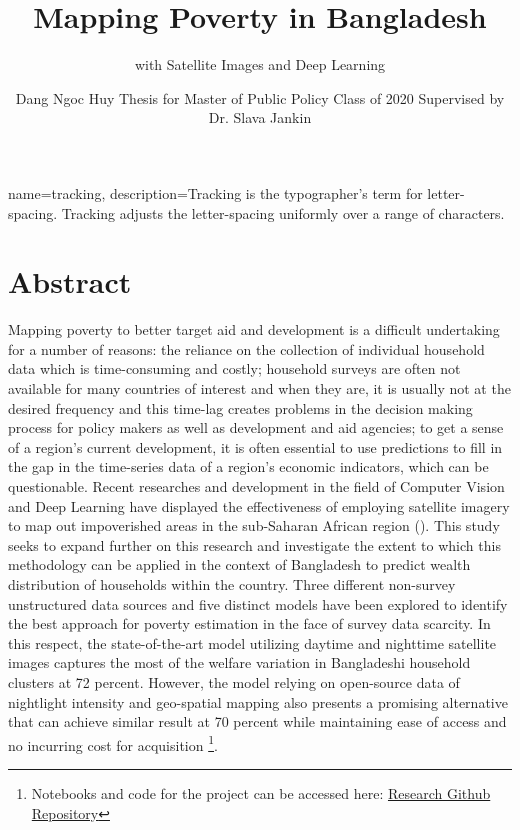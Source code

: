 \documentclass[solid,math,chem,code,plot,gloss]{bmc}
\title{Mapping Poverty in Bangladesh}
\subtitle{with Satellite Images and Deep Learning}
\author{Dang Ngoc Huy \footnotesize \newline \newline Thesis for Master of Public Policy \newline Class of 2020 \newline Supervised by Dr. Slava Jankin}
\begin{document}
{
    name=tracking,
    description={Tracking is the typographer's term for letter-spacing. Tracking adjusts the letter-spacing uniformly over a range of characters.}
}

\maketitle

\section*{Abstract}

\vspace{1cm}

Mapping poverty to better target aid and development is a difficult undertaking for a number of reasons: the reliance on the collection of individual household data which is time-consuming and costly; household surveys are often not available for many countries of interest and when they are, it is usually not at the desired frequency and this time-lag creates problems in the decision making process for policy makers as well as development and aid agencies; to get a sense of a region’s current development, it is often essential to use predictions to fill in the gap in the time-series data of a region’s economic indicators, which can be questionable. Recent researches and development in the field of Computer Vision and Deep Learning have displayed the effectiveness of employing satellite imagery to map out impoverished areas in the sub-Saharan African region (\cite{Neal_2016}). This study seeks to expand further on this research and investigate the extent to which this methodology can be applied in the context of Bangladesh to predict wealth distribution of households within the country. Three different non-survey unstructured data sources and five distinct models have been explored to identify the best approach for poverty estimation in the face of survey data scarcity. In this respect, the state-of-the-art model utilizing daytime and nighttime satellite images captures the most of the welfare variation in Bangladeshi household clusters at 72 percent. However, the model relying on open-source data of nightlight intensity and geo-spatial mapping also presents a promising alternative that can achieve similar result at 70 percent while maintaining ease of access and no incurring cost for acquisition \footnote{Notebooks and code for the project can be accessed here: \href{https://github.com/huydang90/Mapping-Poverty-With-Satellite-Images}{Research Github Repository}}. 
\end{document}
